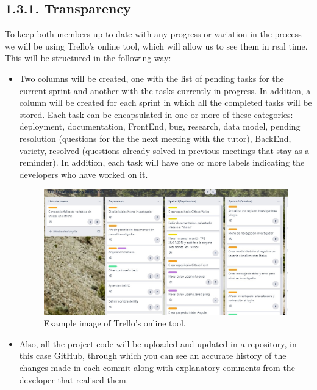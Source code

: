     \subsection*{1.3.1. Transparency}

    To keep both members up to date with any progress or variation in the process we will be using Trello's online tool, which will allow us to see them in real time. This will be structured in the following way:
    
    \begin{itemize}
    \item Two columns will be created, one with the list of pending tasks for the current sprint and another with the tasks currently in progress. In addition, a column will be created for each sprint in which all the completed tasks will be stored. Each task can be encapsulated in one or more of these categories: deployment, documentation, FrontEnd, bug, research, data model, pending resolution (questions for the the next meeting with the tutor), BackEnd, variety, resolved (questions already solved in previous meetings that stay as a reminder). In addition, each task will have one or more labels indicating the developers who have worked on it.\newline

    
     \begin{figure}[h]
    \centering
     \includegraphics[width=1\textwidth]{images/Trello.jpg}
    \caption{Example image of Trello's online tool.}
    \end{figure}
    \newpage
    
    \item  Also, all the project code will be uploaded and updated in a repository, in this case GitHub\cite{github}, through which you can see an accurate history of the changes made in each commit along with explanatory comments from the developer that realised them.\newline


\end{itemize}
